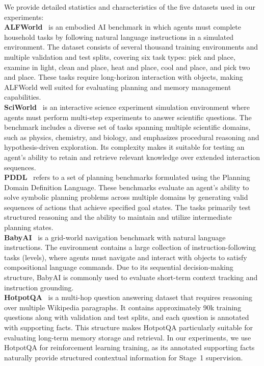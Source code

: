 We provide detailed statistics and characteristics of the five datasets used in our experiments:
\\
\textbf{ALFWorld}~\citep{shridhar2020alfworld} is an embodied AI benchmark in which agents must complete household tasks by following natural language instructions in a simulated environment. The dataset consists of several thousand training environments and multiple validation and test splits, covering six task types: pick and place, examine in light, clean and place, heat and place, cool and place, and pick two and place. These tasks require long-horizon interaction with objects, making ALFWorld well suited for evaluating planning and memory management capabilities.
\\
\textbf{SciWorld}~\citep{wang2022scienceworld} is an interactive science experiment simulation environment where agents must perform multi-step experiments to answer scientific questions. The benchmark includes a diverse set of tasks spanning multiple scientific domains, such as physics, chemistry, and biology, and emphasizes procedural reasoning and hypothesis-driven exploration. Its complexity makes it suitable for testing an agent’s ability to retain and retrieve relevant knowledge over extended interaction sequences.
\\
\textbf{PDDL}~\citep{chang2024agentboard} refers to a set of planning benchmarks formulated using the Planning Domain Definition Language. These benchmarks evaluate an agent’s ability to solve symbolic planning problems across multiple domains by generating valid sequences of actions that achieve specified goal states. The tasks primarily test structured reasoning and the ability to maintain and utilize intermediate planning states.
\\
\textbf{BabyAI}~\citep{chevalier2018babyai} is a grid-world navigation benchmark with natural language instructions. The environment contains a large collection of instruction-following tasks (levels), where agents must navigate and interact with objects to satisfy compositional language commands. Due to its sequential decision-making structure, BabyAI is commonly used to evaluate short-term context tracking and instruction grounding.
\\
\textbf{HotpotQA}~\citep{yang2018hotpotqa} is a multi-hop question answering dataset that requires reasoning over multiple Wikipedia paragraphs. It contains approximately 90k training questions along with validation and test splits, and each question is annotated with supporting facts. This structure makes HotpotQA particularly suitable for evaluating long-term memory storage and retrieval. In our experiments, we use HotpotQA for reinforcement learning training, as its annotated supporting facts naturally provide structured contextual information for Stage~1 supervision.

